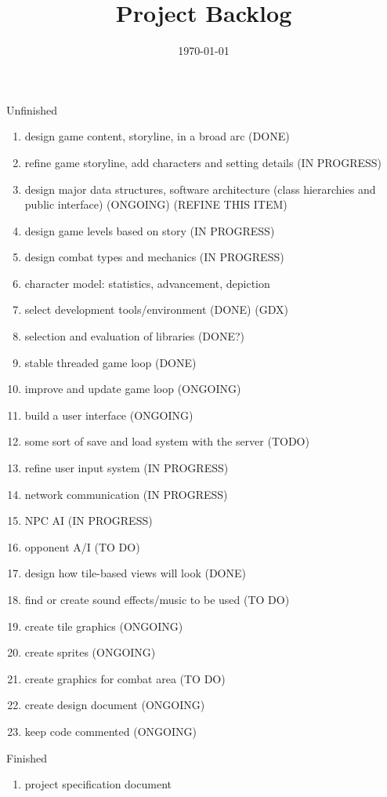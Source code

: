 \documentclass[12pt]{article}
\title{Project Backlog}
\date{\today}
\begin{document}
\maketitle

\begin{section}{Unfinished}
\begin{enumerate}

\item design game content, storyline, in a broad arc (DONE)
\item refine game storyline, add characters and setting details (IN PROGRESS)

\item design major data structures, software architecture (class
	hierarchies and public interface) (ONGOING) (REFINE THIS ITEM)
	
\item design game levels based on story (IN PROGRESS)
\item design combat types and mechanics (IN PROGRESS)

\item character model: statistics, advancement, depiction

\item select development tools/environment (DONE) (GDX)
\item selection and evaluation of libraries (DONE?)

\item stable threaded game loop (DONE)
\item improve and update game loop (ONGOING)
\item build a user interface (ONGOING)
\item some sort of save and load system with the server (TODO)
\item refine user input system (IN PROGRESS)
\item network communication (IN PROGRESS)

\item NPC AI (IN PROGRESS)
\item opponent A/I (TO DO)

\item design how tile-based views will look (DONE)
\item find or create sound effects/music to be used (TO DO)
\item create tile graphics (ONGOING)
\item create sprites (ONGOING)
\item create graphics for combat area (TO DO)

\item create design document (ONGOING)
\item keep code commented (ONGOING)


\end{enumerate}
\end{section}

\begin{section}{Finished}
\begin{enumerate}

\item project specification document

\end{enumerate}
\end{section}
\end{document}
